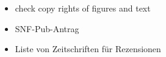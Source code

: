 \begin{itemize}
\item check copy rights of figures and text

\item SNF-Pub-Antrag

\item Liste von Zeitschriften für Rezensionen






\end{itemize}



